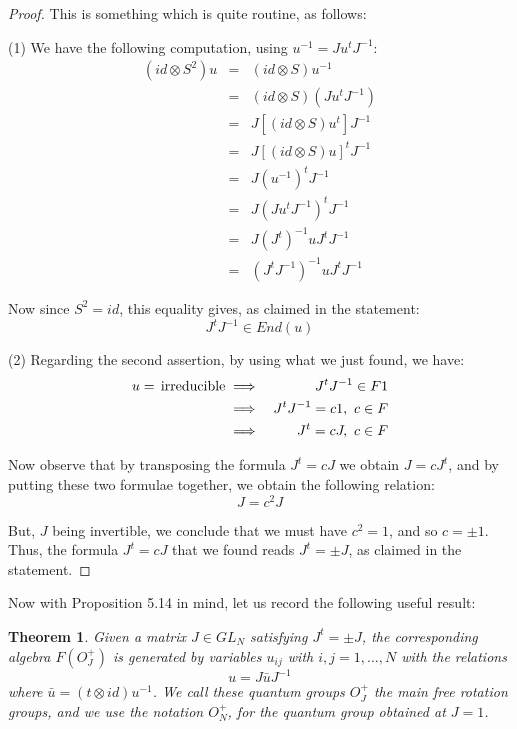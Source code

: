 \documentclass[12pt]{amsbook}
\newtheorem{theorem}{Theorem}[chapter]
\begin{document}
\begin{proof}
This is something which is quite routine, as follows:

\medskip

(1) We have the following computation, using $u^{-1}=Ju^tJ^{-1}$:
\begin{eqnarray*}
(id\otimes S^2)u
&=&(id\otimes S)u^{-1}\\
&=&(id\otimes S)(Ju^tJ^{-1})\\
&=&J[(id\otimes S)u^t]J^{-1}\\
&=&J[(id\otimes S)u]^tJ^{-1}\\
&=&J(u^{-1})^tJ^{-1}\\
&=&J(Ju^tJ^{-1})^tJ^{-1}\\
&=&J(J^t)^{-1}uJ^tJ^{-1}\\
&=&(J^tJ^{-1})^{-1}uJ^tJ^{-1}
\end{eqnarray*}

Now since $S^2=id$, this equality gives, as claimed in the statement:
$$J^tJ^{-1}\in End(u)$$

(2) Regarding the second assertion, by using what we just found, we have:
\begin{eqnarray*}
u=\,{\rm irreducible}
&\implies&J^tJ^{-1}\in F1\\
&\implies&J^tJ^{-1}=c1,\ c\in F\\
&\implies&J^t=cJ,\ c\in F
\end{eqnarray*}

Now observe that by transposing the formula $J^t=cJ$ we obtain $J=cJ^t$, and by putting these two formulae together, we obtain the following relation:
$$J=c^2J$$

But, $J$ being invertible, we conclude that we must have $c^2=1$, and so $c=\pm1$. Thus, the formula $J^t=cJ$ that we found reads $J^t=\pm J$, as claimed in the statement.
\end{proof}

Now with Proposition 5.14 in mind, let us record the following useful result:

\begin{theorem}
Given a matrix $J\in GL_N$ satisfying $J^t=\pm J$, the corresponding algebra $F(O_J^+)$ is generated by variables $u_{ij}$ with $i,j=1,\ldots,N$ with the relations
$$u=J\bar{u}J^{-1}$$
where $\bar{u}=(t\otimes id)u^{-1}$. We call these quantum groups $O_J^+$ the main free rotation groups, and we use the notation $O_N^+$, for the quantum group obtained at $J=1$.
\end{theorem}
\end{document}
